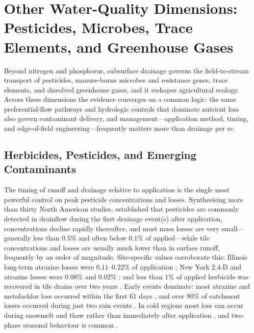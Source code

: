 \documentclass[11pt]{article}
\begin{document}
\section*{Other Water-Quality Dimensions: Pesticides, Microbes, Trace Elements, and Greenhouse Gases}

Beyond nitrogen and phosphorus, subsurface drainage governs the field-to-stream
transport of pesticides, manure-borne microbes and resistance genes, trace
elements, and dissolved greenhouse gases, and it reshapes agricultural ecology.
Across these dimensions the evidence converges on a common logic: the same
preferential-flow pathways and hydrologic controls that dominate nutrient loss
also govern contaminant delivery, and management---application method, timing,
and edge-of-field engineering---frequently matters more than drainage per se.

\subsection{Herbicides, Pesticides, and Emerging Contaminants}

The timing of runoff and drainage relative to application is the single most
powerful control on peak pesticide concentrations and losses. Synthesising more
than thirty North American studies, \textcite{Kladivko2001} established that
pesticides are commonly detected in drainflow during the first drainage event(s)
after application, concentrations decline rapidly thereafter, and most mass
losses are very small---generally less than $0.5\%$ and often below $0.1\%$ of
applied---while tile concentrations and losses are usually much lower than in
surface runoff, frequently by an order of magnitude. Site-specific values
corroborate this: Illinois long-term atrazine losses were $0.11$--$0.22\%$ of
application \parencite{Kalita2006}; New York 2,4-D and atrazine losses were
$0.08\%$ and $0.02\%$ \parencite{Shalit1996}; and less than $1\%$ of applied
herbicide was recovered in tile drains over two years
\parencite{Fortin2002,Siimes2006}. Early events dominate: most atrazine and
metolachlor loss occurred within the first $61$ days \parencite{SOUTHWICK1990},
and over $80\%$ of catchment losses occurred during just two rain events
\parencite{Leu2004}. In cold regions most loss can occur during snowmelt and
thaw rather than immediately after application \parencite{Siimes2006}, and
two-phase seasonal behaviour is common \parencite{Novak2001,Dousset2004}.
\end{document}
